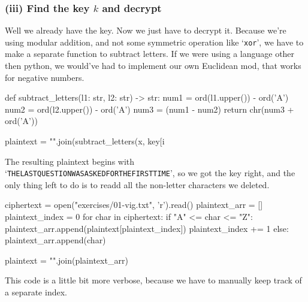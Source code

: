 \documentclass{article}
\begin{document}
  \subsubsection*{(iii) Find the key $k$ and decrypt}
  Well we already have the key. Now we just have to decrypt it.
  Because we're using modular addition, and not some symmetric operation like `\texttt{xor}',
  we have to make a separate function to subtract letters.
  If we were using a language other then python, we would've had to implement our own Euclidean mod, that works for negative numbers.

  \begin{mylisting}
    def subtract_letters(l1: str, l2: str) -> str:
      num1 = ord(l1.upper()) - ord('A')
      num2 = ord(l2.upper()) - ord('A')
      num3 = (num1 - num2) %
      return chr(num3 + ord('A'))

    plaintext = "".join(subtract_letters(x, key[i %
  \end{mylisting}
  The resulting plaintext begins with `\texttt{THELASTQUESTIONWASASKEDFORTHEFIRSTTIME}',
  so we got the key right, and the only thing left to do is to readd all the non-letter characters we deleted.

  \begin{mylisting}
    ciphertext = open("exercises/01-vig.txt", 'r').read()
    plaintext_arr = []
    plaintext_index = 0
    for char in ciphertext:
      if "A" <= char <= "Z":
        plaintext_arr.append(plaintext[plaintext_index])
        plaintext_index += 1
      else:
        plaintext_arr.append(char)

    plaintext = "".join(plaintext_arr)
  \end{mylisting}

  This code is a little bit more verbose, because we have to manually keep track of a separate index.
\end{document}
